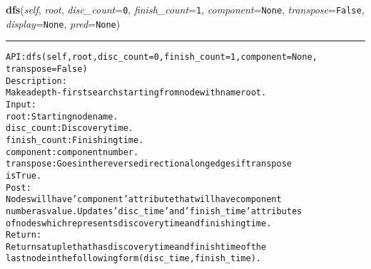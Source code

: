 \hspace{.8\funcindent}\begin{boxedminipage}{\funcwidth}

    \raggedright \textbf{dfs}(\textit{self}, \textit{root}, \textit{disc\_count}={\tt 0}, \textit{finish\_count}={\tt 1}, \textit{component}={\tt None}, \textit{transpose}={\tt False}, \textit{display}={\tt None}, \textit{pred}={\tt None})

    \vspace{-1.5ex}

    \rule{\textwidth}{0.5\fboxrule}
\setlength{\parskip}{2ex}
\begin{alltt}

API: dfs(self, root, disc\_count = 0, finish\_count = 1, component=None,
    transpose=False)
Description:
Make a depth-first search starting from node with name root.
Input:
    root: Starting node name.
    disc\_count: Discovery time.
    finish\_count: Finishing time.
    component: component number.
    transpose: Goes in the reverse direction along edges if transpose
    is True.
Post:
    Nodes will have 'component' attribute that will have component
    number as value. Updates 'disc\_time' and 'finish\_time' attributes
    of nodes which represents discovery time and finishing time.
Return:
    Returns a tuple that has discovery time and finish time of the
    last node in the following form (disc\_time,finish\_time).
\end{alltt}

\setlength{\parskip}{1ex}
    \end{boxedminipage}

    \label{coinor:gimpy:graph:Graph:display}

    \vspace{0.5ex}

